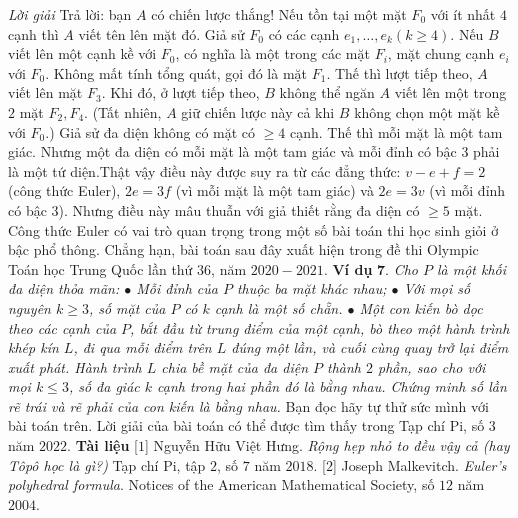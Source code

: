 \begin{multicols}{2}
	\vskip 0.1cm
	\textit{Lời giải}
	Trả lời: bạn $A$ có chiến lược thắng!
	\vskip 0.1cm	
	Nếu tồn tại một mặt $F_0$ với ít nhất $4$ cạnh thì $A$ viết tên lên mặt đó. Giả sử $F_0$ có các cạnh $e_1, \ldots,e_k (k\geq 4)$. Nếu $B$ viết lên một cạnh kề với $F_0$, có nghĩa là một trong các mặt $F_i$, mặt chung cạnh $e_i$ với $F_0$. Không mất tính tổng quát, gọi đó là mặt $F_1$. Thế thì lượt tiếp theo, $A$ viết lên mặt $F_3$. Khi đó, ở lượt tiếp theo, $B$ không thể ngăn $A$ viết lên một trong $2$ mặt $F_2, F_4$. (Tất nhiên, $A$ giữ chiến lược này cả khi $B$ không chọn một mặt kề với $F_0$.)
	\vskip 0.1cm
	Giả sử đa diện không có mặt có $\ge 4$ cạnh. Thế thì mỗi mặt là một tam giác. Nhưng một đa diện có mỗi mặt là một tam giác và mỗi đỉnh có bậc $3$ phải là một tứ diện.Thật vậy điều này được suy ra từ các đẳng thức: $v-e+f=2$ (công thức Euler), $2e=3f$ (vì mỗi mặt là một tam giác) và $2e=3v$ (vì mỗi đỉnh có bậc $3$). Nhưng điều này mâu thuẫn với giả thiết rằng đa diện có $\geq 5 $ mặt. 
	\vskip 0.1cm
	Công thức Euler có vai trò quan trọng trong một số bài toán thi học sinh giỏi ở bậc phổ thông. Chẳng hạn, bài toán sau đây xuất hiện trong đề thi Olympic Toán học Trung Quốc lần thứ $36$, năm $2020-2021$.
	\vskip 0.1cm
	\textbf{\color{hoccungpi}Ví dụ} $\pmb{7.}$ \textit{Cho $P$ là một khối đa diện thỏa mãn: 
	\vskip 0.1cm
	$\bullet$ Mỗi đỉnh của $P$ thuộc ba mặt khác nhau;
	\vskip 0.1cm
	$\bullet$ Với mọi số nguyên $ k \geq 3$, số mặt của $P$ có $k$ cạnh là một số chẵn.
	\vskip 0.1cm
	$\bullet$ Một con kiến bò dọc theo các cạnh của $P$, bắt đầu từ trung điểm của một cạnh, bò theo một hành trình khép kín $L$, đi qua mỗi điểm trên $L$ đúng một lần, và cuối cùng quay trở lại điểm xuất phát. Hành trình $L$ chia bề mặt của đa diện $P$ thành $2$ phần, sao cho với mọi $k \leq 3$, số đa giác $k$ cạnh trong hai phần đó là bằng nhau. Chứng minh số lần rẽ trái và rẽ phải của con kiến là bằng nhau.}
	\vskip 0.1cm
	Bạn đọc hãy tự thử sức mình với bài toán trên. Lời giải của bài toán có thể được tìm thấy trong Tạp chí Pi, số $3$ năm $2022$.
	\vskip 0.1cm
	\textbf{\color{hoccungpi}Tài liệu}
	\vskip 0.1cm
	[$1$] Nguyễn Hữu Việt Hưng. \emph{Rộng hẹp nhỏ to đều vậy cả (hay Tôpô học là gì?)} Tạp chí Pi, tập $2$, số $7$ năm $2018$.
	\vskip 0.1cm
	[$2$] Joseph Malkevitch. \emph{Euler's polyhedral formula}. Notices of the American Mathematical Society, số $12$ năm $2004$.
\end{multicols}